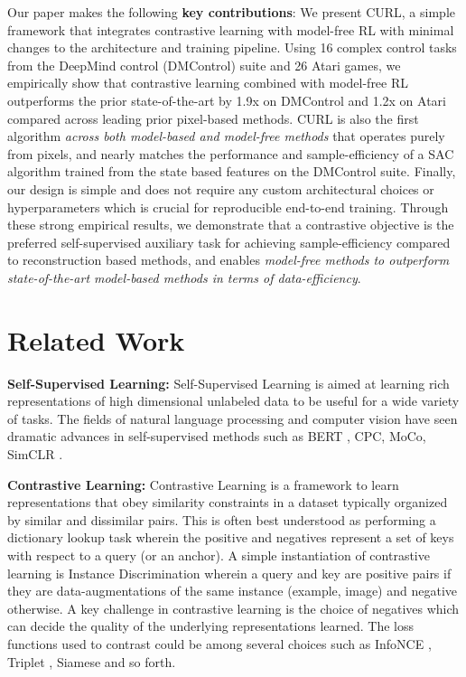 \documentclass{article}
\begin{document}
Our paper makes the following {\textbf{key contributions}}: We present CURL, a simple framework that integrates contrastive learning with model-free RL with minimal changes to the architecture and training pipeline. Using 16 complex control tasks from the DeepMind control (DMControl) suite and 26 Atari games, we empirically show that contrastive learning combined with model-free RL outperforms the prior state-of-the-art by 1.9x on DMControl and 1.2x on Atari compared across leading prior pixel-based methods. CURL is also the first algorithm {\it across both model-based and model-free methods} that operates purely from pixels, and nearly matches the performance and sample-efficiency of a SAC algorithm trained from the state based features on the DMControl suite. Finally, our design is simple and does not require any custom architectural choices or hyperparameters which is crucial for reproducible end-to-end training.  Through these strong empirical results, we demonstrate that a contrastive objective is the preferred self-supervised auxiliary task for achieving sample-efficiency compared to reconstruction based methods, and enables {\it model-free methods to outperform state-of-the-art model-based methods in terms of data-efficiency}.
 \section{Related Work}

{\textbf{Self-Supervised Learning:}} Self-Supervised Learning is aimed at learning rich representations of high dimensional unlabeled data to be useful for a wide variety of tasks. The fields of natural language processing and computer vision have seen dramatic advances in self-supervised methods such as BERT \cite{devlin2018bert}, CPC, MoCo, SimCLR \cite{henaff2019data, he2019momentum,chen2020simclr}.

{\textbf{Contrastive Learning:}} Contrastive Learning is a framework to learn representations that obey similarity constraints in a dataset typically organized by similar and dissimilar pairs. This is often best understood as performing a dictionary lookup task wherein the positive and negatives represent a set of keys with respect to a query (or an anchor). A simple instantiation of contrastive learning is Instance Discrimination \cite{wu2018unsupervised} wherein a query and key are positive pairs if they are data-augmentations of the same instance (example, image) and negative otherwise. A key challenge in contrastive learning is the choice of negatives which can decide the quality of the underlying representations learned. The loss functions used to contrast could be among several choices such as InfoNCE \cite{oord2018representation}, Triplet \cite{wang2015unsupervised}, Siamese \cite{chopra2005learning} and so forth.
\end{document}

